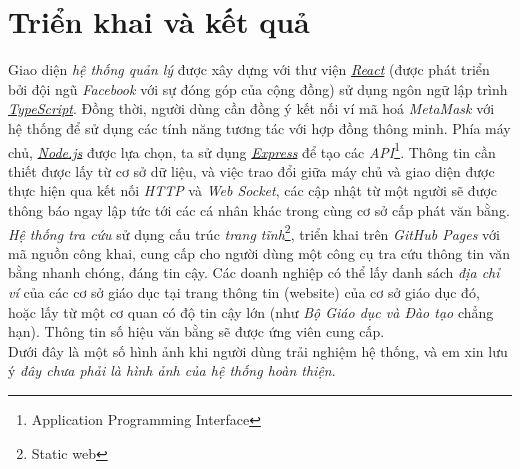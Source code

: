 \newpage
\section{Triển khai và kết quả}

Giao diện \textit{hệ thống quản lý} được xây dựng với thư viện \href{https://reactjs.org}{\textit{React}} (được phát triển bởi đội ngũ \textit{Facebook} với sự đóng góp của cộng đồng) sử dụng ngôn ngữ lập trình \href{https://www.typescriptlang.org/}{\textit{TypeScript}}. Đồng thời, người dùng cần đồng ý kết nối ví mã hoá \textit{MetaMask} với hệ thống để sử dụng các tính năng tương tác với hợp đồng thông minh. Phía máy chủ, \href{https://nodejs.org}{\textit{Node.js}} được lựa chọn, ta sử dụng \href{https://expressjs.com/}{\textit{Express}} để tạo các \textit{API}\footnote{Application Programming Interface}. Thông tin cần thiết được lấy từ cơ sở dữ liệu, và việc trao đổi giữa máy chủ và giao diện được thực hiện qua kết nối \textit{HTTP} và \textit{Web Socket}, các cập nhật từ một người sẽ được thông báo ngay lập tức tới các cá nhân khác trong cùng cơ sở cấp phát văn bằng.\\

\textit{Hệ thống tra cứu} sử dụng cấu trúc \textit{trang tĩnh}\footnote{Static web}, triển khai trên \textit{GitHub Pages} với mã nguồn công khai, cung cấp cho người dùng một công cụ tra cứu thông tin văn bằng nhanh chóng, đáng tin cậy. Các doanh nghiệp có thể lấy danh sách \textit{địa chỉ ví} của các cơ sở giáo dục tại trang thông tin (website) của cơ sở giáo dục đó, hoặc lấy từ một cơ quan có độ tin cậy lớn (như \textit{Bộ Giáo dục và Đào tạo} chẳng hạn). Thông tin số hiệu văn bằng sẽ được ứng viên cung cấp.\\

Dưới đây là một số hình ảnh khi người dùng trải nghiệm hệ thống, và em xin lưu ý \textit{đây chưa phải là hình ảnh của hệ thống hoàn thiện}.\\

